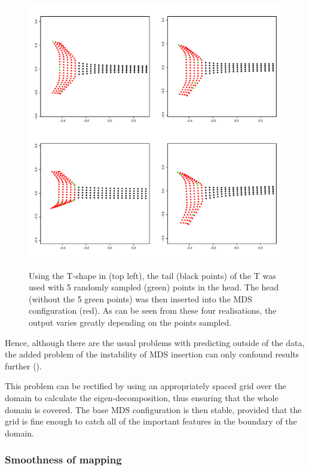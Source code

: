 \begin{figure}
\centering
\includegraphics[width=6in]{mds/figs/tshaperand.pdf} \\
\caption{Using the T-shape in  (top left), the tail (black points) of the T was used with 5 randomly sampled (green) points in the head. The head (without the 5 green points) was then inserted into the MDS configuration (red). As can be seen from these four realisations, the output varies greatly depending on the points sampled.}
\label{tshaperand}
\end{figure}

Hence, although there are the usual problems with predicting outside of the data, the added problem of the instability of MDS insertion can only confound results further (\cite{gower1968}).

This problem can be rectified by using an appropriately spaced grid over the domain to calculate the eigen-decomposition, thus ensuring that the whole domain is covered. The base MDS configuration is then stable, provided that the grid is fine enough to catch all of the important features in the boundary of the domain.

\subsubsection{Smoothness of mapping}
\label{mds-smoothness}


